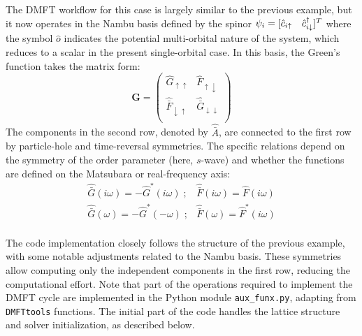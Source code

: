 \documentclass[edipack_sp.tex]{subfiles}
\begin{document}
The DMFT workflow for this case is largely similar to the previous 
example, but it now operates in the Nambu basis defined by the spinor $\psi_i=[\hat{c}_{i\uparrow}\quad  \hat{c}^\dagger_{i\downarrow}]^T$ where the symbol $\hat{o}$ indicates the potential multi-orbital nature of the system, which reduces to a scalar in the present single-orbital case.
In this basis, the Green's function takes the matrix form:
\begin{equation}
  {\mathbf G} =
  \begin{pmatrix}
    \hat{G}_{\uparrow\uparrow} & \hat{F}_{\uparrow\downarrow}\\
    \hat{\bar{F}}_{\downarrow\uparrow}  &    \hat{\bar{G}}_{\downarrow\downarrow} \\
  \end{pmatrix}
\end{equation}
The components in the second row, denoted 
by $\hat{\bar{A}}$, are connected to the first row by particle-hole and time-reversal symmetries. The specific relations depend on the 
symmetry of the order parameter (here, $s$-wave) and whether the 
functions are defined on the Matsubara or real-frequency axis:
\begin{equation}
\begin{array}{cc}
  \hat{\bar{G}}(i\omega) = -\hat{G}^*(i\omega)\;; &  \hat{\bar{F}}(i\omega) = \hat{F}(i\omega)\\
  \hat{\bar{G}}(\omega)  = -\hat{G}^*(-\omega) \;; & \hat{\bar{F}}(\omega) = \hat{F}^*(i\omega)\\
\end{array}
\end{equation}  

The code implementation closely follows the structure of the previous 
example, with some notable adjustments related to the Nambu basis. 
These symmetries allow computing only the 
independent components in the first row, reducing 
the computational effort. 
Note that part of the operations required to implement the DMFT cycle are implemented in the Python module {\tt aux\_funx.py}, adapting from {\tt DMFTtools} functions.  
The initial part of the code handles the 
lattice structure and solver initialization, as described below.
\end{document}
